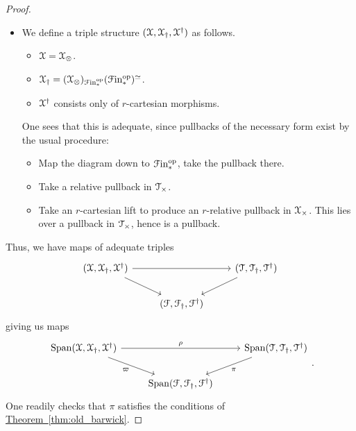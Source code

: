 \documentclass[main.tex]{subfiles}
\begin{document}
\begin{proof}
\begin{itemize}
    \item We define a triple structure $(\mathcal{X}, \mathcal{X}_{\dagger}, \mathcal{X}^{\dagger})$ as follows.
      \begin{itemize}
        \item $\mathcal{X} = \mathcal{X}_{\otimes}$.

        \item $\mathcal{X}_{\dagger} = (\mathcal{X}_{\otimes})_{\mathcal{F}\mathrm{in}_{*}^{\mathrm{op}}}(\mathcal{F}\mathrm{in}_{*}^{\mathrm{op}})^{\simeq}$.

        \item $\mathcal{X}^{\dagger}$ consists only of $r$-cartesian morphisms.
      \end{itemize}

      One sees that this is adequate, since pullbacks of the necessary form exist by the usual procedure:
      \begin{itemize}
        \item Map the diagram down to $\mathcal{F}\mathrm{in}_{*}^{\mathrm{op}}$, take the pullback there.

        \item Take a relative pullback in $\mathcal{T}_{\times}$.

        \item Take an $r$-cartesian lift to produce an $r$-relative pullback in $\mathcal{X}_{\times}$. This lies over a pullback in $\mathcal{T}_{\times}$, hence is a pullback.
      \end{itemize}
  \end{itemize}

  Thus, we have maps of adequate triples
  \begin{equation*}
    \begin{tikzcd}
      \triple{X}
      \arrow[rr]
      \arrow[dr]
      && \triple{T}
      \arrow[dl]
      \\
      & \triple{F}
    \end{tikzcd}
  \end{equation*}
  giving us maps
  \begin{equation*}
    \begin{tikzcd}
      \Span\triple{X}
      \arrow[rr, "\rho"]
      \arrow[dr, swap, "\varpi"]
      && \Span\triple{T}
      \arrow[dl, "\pi"]
      \\
      & \Span\triple{F}
    \end{tikzcd}.
  \end{equation*}
  One readily checks that $\pi$ satisfies the conditions of \hyperref[thm:old_barwick]{Theorem~\ref*{thm:old_barwick}}.
\end{proof}
\end{document}
